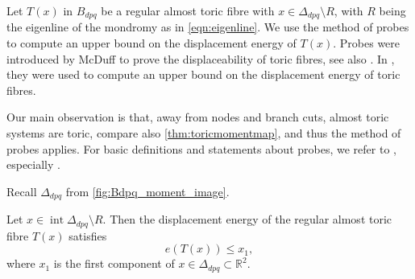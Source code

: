 \documentclass[12pt,a4paper,abstract=true,draft]{scrartcl}
\DeclareMathOperator{\interior}{int}
\begin{document}
Let $T(x)$ in $B_{dpq}$ be a regular almost toric fibre with $x \in \Delta_{dpq} \setminus R$, with $R$ being the eigenline of the mondromy as in \eqref{eqn:eigenline}.
We use the method of probes to compute an upper bound on the displacement energy of $T(x)$.
Probes were introduced by McDuff \cite{mcduff2011displacing} to prove the displaceability of toric fibres, see also \cite{AbrBorMcD14}.
In \cite{brendel2020real}, they were used to compute an upper bound on the displacement energy of toric fibres.

Our main observation is that, away from nodes and branch cuts, almost toric systems are toric, compare also \cref{thm:toricmomentmap}, and thus the method of probes applies.
For basic definitions and statements about probes, we refer to \cite{mcduff2011displacing}, especially \cite[Definition 2.3, Lemma 2.4]{mcduff2011displacing}.

Recall $Δ_{dpq}$ from \cref{fig:Bdpq_moment_image}.


\begin{lemma}
    \label{thm:upper_bound}
    Let $x \in \interior \Delta_{dpq} \setminus R$.
Then the displacement energy of the regular almost toric fibre $T(x)$ satisfies
    \[ e(T(x))\leq x_1, \]
    where $x_1$ is the first component of $x \in \Delta_{dpq} \subset \mathbb{R}^2$.
\end{lemma}
\end{document}
